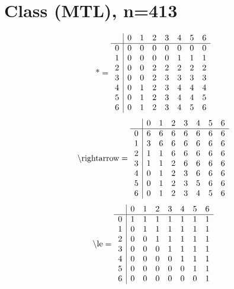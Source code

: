 \documentclass[11pt]{article}
\begin{document}
\section{Class (MTL), n=413}
\[\text{*} = 
\begin{array}{r | r r r r r r r}
 & 0 & 1 & 2 & 3 & 4 & 5 & 6 \\ \hline
0 & 0 & 0 & 0 & 0 & 0 & 0 & 0 \\
1 & 0 & 0 & 0 & 0 & 1 & 1 & 1 \\
2 & 0 & 0 & 2 & 2 & 2 & 2 & 2 \\
3 & 0 & 0 & 2 & 3 & 3 & 3 & 3 \\
4 & 0 & 1 & 2 & 3 & 4 & 4 & 4 \\
5 & 0 & 1 & 2 & 3 & 4 & 4 & 5 \\
6 & 0 & 1 & 2 & 3 & 4 & 5 & 6 \\
\end{array}
\]
\[\text{\textbackslash rightarrow} = 
\begin{array}{r | r r r r r r r}
 & 0 & 1 & 2 & 3 & 4 & 5 & 6 \\ \hline
0 & 6 & 6 & 6 & 6 & 6 & 6 & 6 \\
1 & 3 & 6 & 6 & 6 & 6 & 6 & 6 \\
2 & 1 & 1 & 6 & 6 & 6 & 6 & 6 \\
3 & 1 & 1 & 2 & 6 & 6 & 6 & 6 \\
4 & 0 & 1 & 2 & 3 & 6 & 6 & 6 \\
5 & 0 & 1 & 2 & 3 & 5 & 6 & 6 \\
6 & 0 & 1 & 2 & 3 & 4 & 5 & 6 \\
\end{array}
\]
\[\text{\textbackslash le} = 
\begin{array}{r | r r r r r r r}
 & 0 & 1 & 2 & 3 & 4 & 5 & 6 \\ \hline
0 & 1 & 1 & 1 & 1 & 1 & 1 & 1 \\
1 & 0 & 1 & 1 & 1 & 1 & 1 & 1 \\
2 & 0 & 0 & 1 & 1 & 1 & 1 & 1 \\
3 & 0 & 0 & 0 & 1 & 1 & 1 & 1 \\
4 & 0 & 0 & 0 & 0 & 1 & 1 & 1 \\
5 & 0 & 0 & 0 & 0 & 0 & 1 & 1 \\
6 & 0 & 0 & 0 & 0 & 0 & 0 & 1 \\
\end{array}
\]
\end{document}
